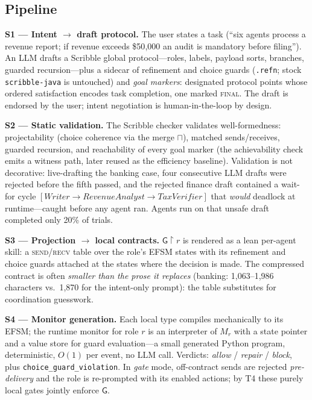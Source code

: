 \documentclass{article}
\newcommand{\gtG}{\mathsf{G}}
\newcommand{\proj}[2]{#1\!\upharpoonright\!#2}
\newcommand{\merge}{\sqcap}
\begin{document}
\subsection{Pipeline}\label{sec:pipeline}
\textbf{S1 --- Intent $\to$ draft protocol.} The user states a task (``six agents process a revenue report; if revenue exceeds \$50{,}000 an audit is mandatory before filing''). An LLM drafts a Scribble global protocol---roles, labels, payload sorts, branches, guarded recursion---plus a sidecar of refinement and choice guards (\texttt{.refn}; stock \texttt{scribble-java} is untouched) and \emph{goal markers}: designated protocol points whose ordered satisfaction encodes task completion, one marked \textsc{final}. The draft is endorsed by the user; intent negotiation is human-in-the-loop by design.

\textbf{S2 --- Static validation.} The Scribble checker validates well-formedness: projectability (choice coherence via the merge $\merge$), matched sends/receives, guarded recursion, and reachability of every goal marker (the achievability check emits a witness path, later reused as the efficiency baseline). Validation is not decorative: live-drafting the banking case, four consecutive LLM drafts were rejected before the fifth passed, and the rejected finance draft contained a wait-for cycle $[\textit{Writer}\to\textit{RevenueAnalyst}\to\textit{TaxVerifier}]$ that \emph{would} deadlock at runtime---caught before any agent ran. Agents run on that unsafe draft completed only 20\% of trials.

\textbf{S3 --- Projection $\to$ local contracts.} $\proj{\gtG}{r}$ is rendered as a lean per-agent skill: a \textsc{send}/\textsc{recv} table over the role's EFSM states with its refinement and choice guards attached at the states where the decision is made. The compressed contract is often \emph{smaller than the prose it replaces} (banking: 1{,}063--1{,}986 characters vs.\ 1{,}870 for the intent-only prompt): the table substitutes for coordination guesswork.

\textbf{S4 --- Monitor generation.} Each local type compiles mechanically to its EFSM; the runtime monitor for role $r$ is an interpreter of $M_r$ with a state pointer and a value store for guard evaluation---a small generated Python program, deterministic, $O(1)$ per event, no LLM call. Verdicts: \emph{allow} / \emph{repair} / \emph{block}, plus \texttt{choice\_guard\_violation}. In \emph{gate} mode, off-contract sends are rejected \emph{pre-delivery} and the role is re-prompted with its enabled actions; by T4 these purely local gates jointly enforce $\gtG$.
\end{document}
